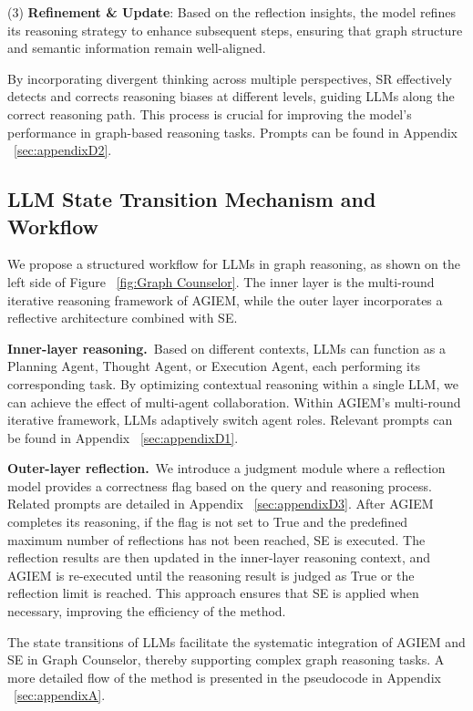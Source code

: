 \documentclass[11pt]{article}
\begin{document}
(3) \textbf{Refinement \& Update}: Based on the reflection insights, the model refines its reasoning strategy to enhance subsequent steps, ensuring that graph structure and semantic information remain well-aligned.

By incorporating divergent thinking across multiple perspectives, SR effectively detects and corrects reasoning biases at different levels, guiding LLMs along the correct reasoning path. This process is crucial for improving the model’s performance in graph-based reasoning tasks. Prompts can be found in Appendix ~\ref{sec:appendixD2}.


\subsection{LLM State Transition Mechanism and Workflow}
We propose a structured workflow for LLMs in graph reasoning, as shown on the left side of Figure ~\ref{fig:Graph Counselor}. The inner layer is the multi-round iterative reasoning framework of AGIEM, while the outer layer incorporates a reflective architecture combined with SE.

\noindent\textbf{Inner-layer reasoning.} \,Based on different contexts, LLMs can function as a Planning Agent, Thought Agent, or Execution Agent, each performing its corresponding task. By optimizing contextual reasoning within a single LLM, we can achieve the effect of multi-agent collaboration. Within AGIEM’s multi-round iterative framework, LLMs adaptively switch agent roles. Relevant prompts can be found in Appendix ~\ref{sec:appendixD1}.

\noindent\textbf{Outer-layer reflection.} \,We introduce a judgment module where a reflection model provides a correctness flag based on the query and reasoning process. Related prompts are detailed in Appendix ~\ref{sec:appendixD3}. After AGIEM completes its reasoning, if the flag is not set to True and the predefined maximum number of reflections has not been reached, SE is executed. The reflection results are then updated in the inner-layer reasoning context, and AGIEM is re-executed until the reasoning result is judged as True or the reflection limit is reached. This approach ensures that SE is applied when necessary, improving the efficiency of the method.


The state transitions of LLMs facilitate the systematic integration of AGIEM and SE in Graph Counselor, thereby supporting complex graph reasoning tasks. A more detailed flow of the method is presented in the pseudocode in Appendix ~\ref{sec:appendixA}.
\end{document}
